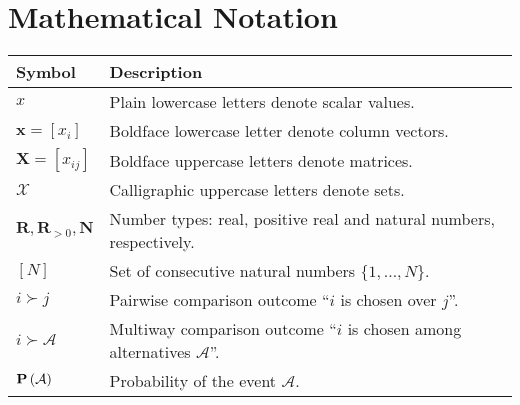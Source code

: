 \cleardoublepage
\chapter*{Mathematical Notation}

\begingroup
\setlength{\parindent}{0cm}
\renewcommand*{\arraystretch}{1.5}

\begin{tabularx}{\linewidth}{lX}
	Symbol & Description                                                                                                                       \\
	\midrule
	$x$
	       & Plain lowercase letters denote scalar values.                                                                                     \\
	$\bm{x} = [x_i]$
	       & Boldface lowercase letter denote column vectors.                                                                                  \\
	$\bm{X} = [x_{ij}]$
	       & Boldface uppercase letters denote matrices.                                                                                       \\
	$\mathcal{X}$
	       & Calligraphic uppercase letters denote sets.                                                                                       \\
	$\mathbf{R}, \mathbf{R}_{>0}, \mathbf{N}$
	       & Number types: real, positive real and natural numbers, respectively.                                                              \\
	$[N]$
	       & Set of consecutive natural numbers $\{ 1, \ldots, N \}$.                                                                          \\
	$i \succ j$
	       & Pairwise comparison outcome ``$i$ is chosen over $j$''.                                                                           \\
	$i \succ \mathcal{A}$
	       & Multiway comparison outcome ``$i$ is chosen among alternatives $\mathcal{A}$''.                                                   \\
	$\mathbf{P}\left( \mathcal{A} \right)$
	       & Probability of the event $\mathcal{A}$.                                                                                           \\

\end{tabularx}
